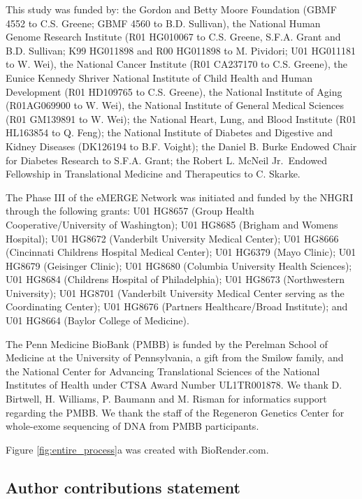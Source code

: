 \documentclass[
  a4paper,
]{article}
\begin{document}
This study was funded by:
the Gordon and Betty Moore Foundation (GBMF 4552 to C.S. Greene; GBMF 4560 to B.D. Sullivan),
the National Human Genome Research Institute (R01 HG010067 to C.S. Greene, S.F.A. Grant and B.D. Sullivan; K99 HG011898 and R00 HG011898 to M. Pividori; U01 HG011181 to W. Wei),
the National Cancer Institute (R01 CA237170 to C.S. Greene),
the Eunice Kennedy Shriver National Institute of Child Health and Human Development (R01 HD109765 to C.S. Greene),
the National Institute of Aging (R01AG069900 to W. Wei),
the National Institute of General Medical Sciences (R01 GM139891 to W. Wei);
the National Heart, Lung, and Blood Institute (R01 HL163854 to Q. Feng);
the National Institute of Diabetes and Digestive and Kidney Diseases (DK126194 to B.F. Voight);
the Daniel B. Burke Endowed Chair for Diabetes Research to S.F.A. Grant;
the Robert L. McNeil Jr.~Endowed Fellowship in Translational Medicine and Therapeutics to C. Skarke.

The Phase III of the eMERGE Network was initiated and funded by the NHGRI through the following grants:
U01 HG8657 (Group Health Cooperative/University of Washington);
U01 HG8685 (Brigham and Womens Hospital);
U01 HG8672 (Vanderbilt University Medical Center);
U01 HG8666 (Cincinnati Childrens Hospital Medical Center);
U01 HG6379 (Mayo Clinic);
U01 HG8679 (Geisinger Clinic);
U01 HG8680 (Columbia University Health Sciences);
U01 HG8684 (Childrens Hospital of Philadelphia);
U01 HG8673 (Northwestern University);
U01 HG8701 (Vanderbilt University Medical Center serving as the Coordinating Center);
U01 HG8676 (Partners Healthcare/Broad Institute);
and U01 HG8664 (Baylor College of Medicine).

The Penn Medicine BioBank (PMBB) is funded by the Perelman School of Medicine at the University of Pennsylvania, a gift from the Smilow family, and the National Center for Advancing Translational Sciences of the National Institutes of Health under CTSA Award Number UL1TR001878.
We thank D. Birtwell, H. Williams, P. Baumann and M. Risman for informatics support regarding the PMBB.
We thank the staff of the Regeneron Genetics Center for whole-exome sequencing of DNA from PMBB participants.

Figure \ref{fig:entire_process}a was created with BioRender.com.

\hypertarget{author-contributions-statement}{%
\subsection{Author contributions statement}\label{author-contributions-statement}}
\end{document}
